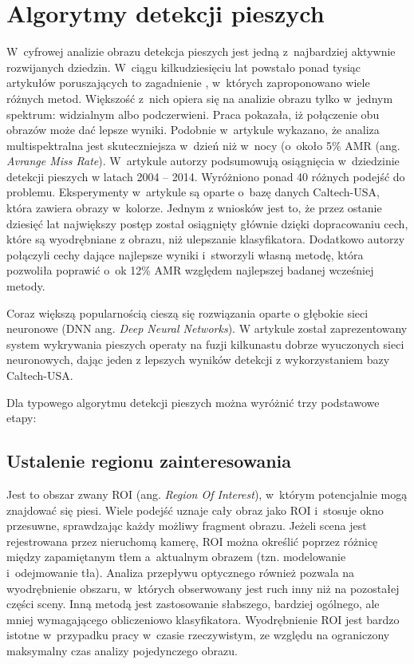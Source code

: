 \chapter{Algorytmy detekcji pieszych}
\label{cha:algoDetPiesz}

W~cyfrowej analizie obrazu detekcja pieszych jest jedną z~najbardziej aktywnie rozwijanych dziedzin.
W~ciągu kilkudziesięciu lat powstało ponad tysiąc artykułów poruszających to zagadnienie \cite{zhang2015filtered}, w~których zaproponowano wiele różnych metod.
Większość z~nich opiera się na analizie obrazu tylko w~jednym spektrum: widzialnym albo podczerwieni.
Praca \cite{hwang2015multispectral} pokazała, iż połączenie obu obrazów może dać lepsze wyniki.
Podobnie w~artykule \cite{gonzalez2016pedestrian} wykazano, że analiza multispektralna jest skuteczniejsza w~dzień niż w~nocy (o~około 5\% AMR (ang. \textit{Avrange Miss Rate}).
W~artykule \cite{benenson2014ten} autorzy podsumowują osiągnięcia w~dziedzinie detekcji pieszych w latach 2004 -- 2014.
Wyróżniono ponad 40 różnych podejść do problemu.
Eksperymenty w~artykule są oparte o~bazę danych Caltech-USA, która zawiera obrazy w~kolorze.
Jednym z wniosków jest to, że przez ostanie dziesięć lat największy postęp został osiągnięty głównie dzięki dopracowaniu cech, które są wyodrębniane z obrazu, niż ulepszanie klasyfikatora.
Dodatkowo autorzy połączyli cechy dające najlepsze wyniki i~stworzyli własną metodę, która pozwoliła poprawić o~ok 12\% AMR względem najlepszej badanej wcześniej metody.

Coraz większą popularnością cieszą się rozwiązania oparte o głębokie sieci neuronowe  (DNN ang. \textit{Deep Neural Networks}). W artykule \cite{du2017fused} został zaprezentowany system wykrywania pieszych operaty na fuzji kilkunastu dobrze wyuczonych sieci neuronowych, dając jeden z lepszych wyników detekcji z wykorzystaniem bazy Caltech-USA. 

Dla typowego algorytmu detekcji pieszych można wyróżnić trzy podstawowe etapy:

\section{Ustalenie regionu zainteresowania}

Jest to obszar zwany ROI (ang. \textit{Region Of Interest}), w~którym potencjalnie mogą znajdować się piesi.
Wiele podejść uznaje cały obraz jako ROI i~stosuje okno przesuwne, sprawdzając każdy możliwy fragment obrazu.
Jeżeli scena jest rejestrowana przez nieruchomą kamerę, ROI można określić poprzez różnicę między zapamiętanym tłem a~aktualnym obrazem (tzn. modelowanie i~odejmowanie tła). 
Analiza przepływu optycznego również pozwala na wyodrębnienie obszaru, w~których obserwowany jest ruch inny niż na pozostałej części sceny. 
Inną metodą jest zastosowanie słabszego, bardziej ogólnego, ale mniej wymagającego obliczeniowo  klasyfikatora.
Wyodrębnienie ROI jest bardzo istotne w~przypadku pracy w~czasie rzeczywistym, ze względu na ograniczony maksymalny czas analizy pojedynczego obrazu.


